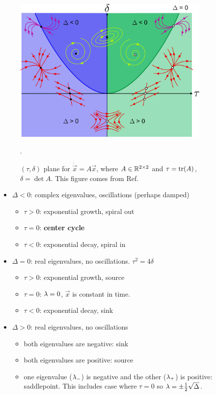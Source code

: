 \begin{figure}[h!]
\centering
\includegraphics[width=3.8in]
{dynamical-sys/Phase_plane_nodes.png}
\caption{
$(\tau, \delta)$ plane
for $\dot{\vec{x}} = A \vec{x}$, where $A\in  { \mathbb{R}}^{2\times 2}$ and  $\tau={\rm tr }(A)$, $\delta=\det{A}$. This
figure  comes from Ref.\cite{wiki-phase-plane}}.
\label{fig-wiki-pp}
\end{figure}

\begin{itemize}
\item $\Delta < 0$:
complex eigenvalues,
oscillations (perhaps damped)
\begin{itemize}[\checkmark]
\item $\tau>0$: exponential growth, spiral out
\item $\tau=0$: {\bf center cycle}
\item $\tau<0$: exponential decay, spiral in
\end{itemize}


\item $\Delta = 0$:
real eigenvalues,
no oscillations. $\tau^2 = 4\delta$
\begin{itemize}[\checkmark]
\item $\tau>0$: exponential growth, source
\item $\tau=0$: $\lambda=0$, $\vec{x}$ is constant in time.
\item $\tau<0$: exponential decay, sink
\end{itemize}

\item $\Delta > 0$:
real eigenvalues,
no oscillations 

\begin{itemize}[\checkmark]
\item both eigenvalues are negative: sink
\item both eigenvalues are positive: source
\item one eigenvalue ($\lambda_-$) is negative 
and the other ($\lambda_+$) is positive: saddlepoint. This 
includes case where $\tau=0$ so $\lambda =\pm\frac{1}{2}\sqrt{\Delta}$.
\end{itemize}
\end{itemize}

